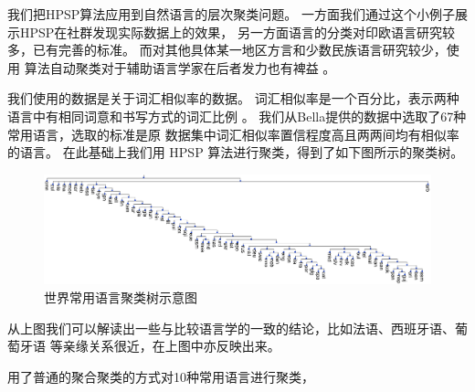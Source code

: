 \documentclass{ctexart}
\begin{document}
我们把HPSP算法应用到自然语言的层次聚类问题。
一方面我们通过这个小例子展示HPSP在社群发现实际数据上的效果，
另一方面语言的分类对印欧语言研究较多，已有完善的标准。 
而对其他具体某一地区方言和少数民族语言研究较少，使用
算法自动聚类对于辅助语言学家在后者发力也有裨益 \cite{nasution2019visualizing}。

我们使用的数据是关于词汇相似率的数据。
词汇相似率是一个百分比，表示两种语言中有相同词意和书写方式的词汇比例
\cite{bella2021database}。
我们从Bella提供的数据中选取了67种常用语言，选取的标准是原
数据集中词汇相似率置信程度高且两两间均有相似率的语言。
在此基础上我们用 HPSP 算法进行聚类，得到了如下图所示的聚类树。
\begin{figure}[!ht]
    \centering
    \includegraphics[width=\textwidth]{figures/language_tree.pdf}
    \caption{世界常用语言聚类树示意图}\label{fig:language_tree}
\end{figure}
    
从上图我们可以解读出一些与比较语言学的一致的结论，比如法语、西班牙语、葡萄牙语
等亲缘关系很近，在上图中亦反映出来。

\cite{al2017characterization} 用了普通的聚合聚类的方式对10种常用语言进行聚类，




\end{document}
